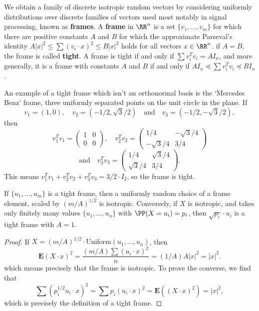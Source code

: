 We obtain a family of discrete isotropic random vectors by considering uniformly distributions over discrete families of vectors used most notably in signal processing, known as {\bf frames}. A {\bf frame} in $\RR^n$ is a set $\{ v_1, \dots, v_m \}$ for which there are positive constants $A$ and $B$ for which the approximate Parseval's identity $A |x|^2 \leq \sum (v_i \cdot x)^2 \leq B |x|^2$ holds for all vectors $x \in \RR^n$. if $A = B$, the frame is called {\bf tight}. A frame is tight if and only if $\sum v_i^T v_i = A I_n$, and more generally, it is a frame with constants $A$ and $B$ if and only if $A I_n \preceq \sum v_i^T v_i \preceq B I_n$.

\begin{example}
    An example of a tight frame which isn't an orthonormal basis is the `Mercedes Benz' frame, three uniformly separated points on the unit circle in the plane. If
    \[ v_1 = (1,0),\quad v_2 = \left( -1/2, \sqrt{3}/2 \right)\quad\text{and}\quad v_3 = \left( -1/2, -\sqrt{3}/2 \right), \]
    then
    \[ v_1^T v_1 = \begin{pmatrix} 1 & 0 \\ 0 & 0 \end{pmatrix},\quad v_2^T v_2 = \begin{pmatrix} 1/4 & -\sqrt{3}/4 \\ - \sqrt{3}/4 & 3/4 \end{pmatrix} \]
    \[ \text{and}\quad v_3^T v_3 = \begin{pmatrix} 1/4 & \sqrt{3}/4 \\ \sqrt{3}/4 & 3/4 \end{pmatrix}. \]
    This means $v_1^T v_1 + v_2^T v_2 + v_3^T v_3 = 3/2 \cdot I_2$, so the frame is tight.
\end{example}

\begin{theorem}
    If $\{ u_1, \dots, u_m \}$ is a tight frame, then a uniformly random choice of a frame element, scaled by $(m/A)^{1/2}$ is isotropic. Conversely, if $X$ is isotropic, and takes only finitely many values $\{ u_1, \dots, u_n \}$ with $\PP(X = u_i) = p_i$, then $\sqrt{p_i} \cdot u_i$ is a tight frame with $A = 1$.
\end{theorem}
\begin{proof}
    If $X = (m/A)^{1/2} \cdot \text{Uniform}(u_1, \dots, u_n)$, then
    \[ \mathbf{E} (X \cdot x)^2 = \frac{(m/A) \sum (u_i \cdot x)^2}{n} = (1/A) A|x|^2 = |x|^2. \]
    which means precisely that the frame is isotropic. To prove the converse, we find that
    \[ \sum (p_i^{1/2} u_i \cdot x)^2 = \sum p_i (u_i \cdot x)^2 = \mathbf{E}((X \cdot x)^2) = |x|^2, \]
    which is precisely the definition of a tight frame.
\end{proof}

